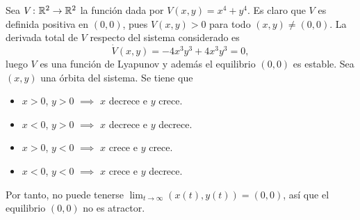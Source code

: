 \documentclass[11pt]{report}
\begin{document}
\begin{solution}
    Sea $V \colon \mathbb R^2\to\mathbb R^2$ la función dada por $V(x,y) = x^4+y^4$. Es claro que $V$ es definida positiva en $(0,0)$, pues $V(x,y) >0$ para todo $(x,y)\neq(0,0)$. La derivada total de $V$ respecto del sistema considerado es
    \[\dot{V}(x,y) = -4x^3y^3+4x^3y^3 = 0,\]
    luego $V$ es una función de Lyapunov y además el equilibrio $(0,0)$ es estable. Sea $(x,y)$ una órbita del sistema. Se tiene que
    \begin{itemize}
        \item $x > 0$, $y > 0$ $\implies$ $x$ decrece e $y$ crece.
        \item $x < 0$, $y > 0$ $\implies$ $x$ decrece e $y$ decrece.
        \item $x > 0$, $y < 0$ $\implies$ $x$ crece e $y$ crece.
        \item $x < 0$, $y < 0$ $\implies$ $x$ crece e $y$ decrece.
    \end{itemize}
    Por tanto, no puede tenerse $\lim_{t\to\infty}(x(t),y(t)) = (0,0)$, así que el equilibrio $(0,0)$ no es atractor.
\end{solution}
\end{document}
